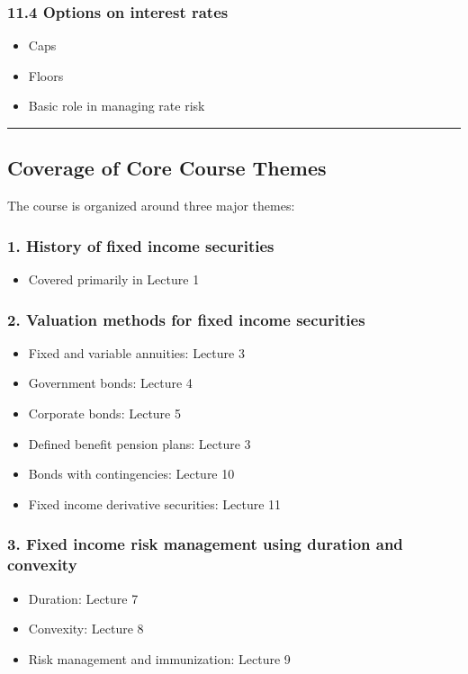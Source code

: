 \documentclass[
  letterpaper,
  DIV=11,
  numbers=noendperiod]{scrartcl}
\providecommand{\tightlist}{%
  \setlength{\itemsep}{0pt}\setlength{\parskip}{0pt}}
\begin{document}
\subsubsection{11.4 Options on interest
rates}\label{options-on-interest-rates}

\begin{itemize}
\tightlist
\item
  Caps
\item
  Floors
\item
  Basic role in managing rate risk
\end{itemize}

\begin{center}\rule{0.5\linewidth}{0.5pt}\end{center}

\subsection{Coverage of Core Course
Themes}\label{coverage-of-core-course-themes}

The course is organized around three major themes:

\subsubsection{1. History of fixed income
securities}\label{history-of-fixed-income-securities}

\begin{itemize}
\tightlist
\item
  Covered primarily in Lecture 1
\end{itemize}

\subsubsection{2. Valuation methods for fixed income
securities}\label{valuation-methods-for-fixed-income-securities}

\begin{itemize}
\tightlist
\item
  Fixed and variable annuities: Lecture 3
\item
  Government bonds: Lecture 4
\item
  Corporate bonds: Lecture 5
\item
  Defined benefit pension plans: Lecture 3
\item
  Bonds with contingencies: Lecture 10
\item
  Fixed income derivative securities: Lecture 11
\end{itemize}

\subsubsection{3. Fixed income risk management using duration and
convexity}\label{fixed-income-risk-management-using-duration-and-convexity}

\begin{itemize}
\tightlist
\item
  Duration: Lecture 7
\item
  Convexity: Lecture 8
\item
  Risk management and immunization: Lecture 9
\end{itemize}
\end{document}
